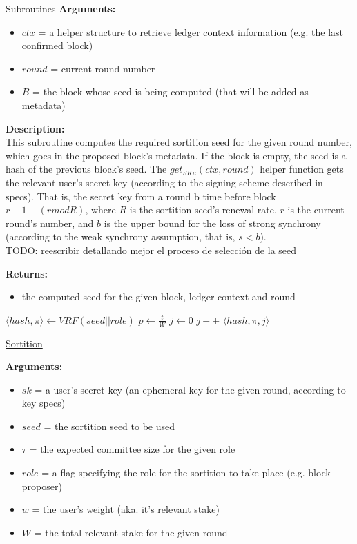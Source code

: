 \documentclass[10pt,a4paper]{article}
\begin{document}
\begin{section}{Subroutines}
\noindent \textbf{Arguments:}
\begin{itemize}
    \item $ctx$ = a helper structure to retrieve ledger context information (e.g. the last confirmed block)
    \item $round$ = current round number
    \item $B$ = the block whose seed is being computed (that will be added as metadata)
  \end{itemize}


\noindent \textbf{Description:}\\
This subroutine computes the required sortition seed for the given round number, which goes in the proposed block's metadata.
If the block is empty, the seed is a hash of the previous block's seed.
The $get_{SKu}(ctx, round)$ helper function gets the relevant user's secret key (according to the signing scheme described in specs).
That is, the secret key from a round b time before block $r-1-(r mod R)$, where $R$ is the sortition seed's renewal rate, $r$ is the current round's number,
and $b$ is the upper bound for the loss of strong synchrony (according to the weak synchrony assumption, that is, $s < b$).\\

TODO: reescribir detallando mejor el proceso de selección de la seed

\noindent \textbf{Returns:}
\begin{itemize}
    \item the computed seed for the given block, ledger context and round
  \end{itemize}

\begin{algorithm}[H]
    \begin{algorithmic}[H]
        \State $ \langle hash, \pi \rangle \gets VRF(seed||role)$
        \State $p \gets \frac{t}{W}$
        \State $j \gets 0$
        \While{$\frac{hash}{2^{hashlen}}\notin [ \sum_{k=0}^jB(k;w,p), \sum_{k=0}^{j+1}B(k;w,p))$}
            \State $j++$
        \EndWhile
        \Return $ \langle hash,\pi,j \rangle$
    \EndFunction
    \end{algorithmic}
    \caption{\underline{Sortition}}
\end{algorithm}


\noindent \textbf{Arguments:}
\begin{itemize}
    \item $sk$ = a user's secret key (an ephemeral key for the given round, according to key specs)
    \item $seed$ = the sortition seed to be used
    \item $\tau$ = the expected committee size for the given role
    \item $role$ = a flag specifying the role for the sortition to take place (e.g. block proposer)
    \item $w$ = the user's weight (aka. it's relevant stake)
    \item $W$ = the total relevant stake for the given round
\end{itemize}


\end{section}
\end{document}
